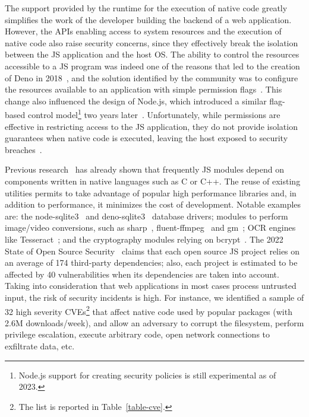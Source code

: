 The support provided by the runtime for the execution of native code
greatly simplifies the work of the developer building the backend of a
web application. However, the APIs enabling access to system resources
and the execution of native code also raise security concerns, since
they effectively break the isolation between the JS application and
the host OS. The ability to control the resources accessible to a JS
program was indeed one of the reasons that led to the creation of Deno
in 2018~\cite{nodejs-regret}, and the solution identified by the
community was to configure the resources available to an application
with simple permission flags~\cite{deno-permissions}. This change also
influenced the design of Node.js, which introduced a similar
flag-based control model\footnote{Node.js support for creating
  security policies is still experimental as of 2023.} two years
later~\cite{node-permissions}. Unfortunately, while permissions are
effective in restricting access to the JS application, they do not
provide isolation guarantees when native code is
executed,
leaving the host exposed to security breaches~\cite{deno-permissions}.

Previous research~\cite{staicu2021bilingual,npm-malicious-update} has
already shown that frequently JS modules depend on components written
in native languages such as C or C++.  The reuse of existing utilities
permits to take advantage of popular high performance libraries and,
in addition to performance, it minimizes the cost of
development. Notable examples are: the node-sqlite3~\cite{
  node-sqlite3} and deno-sqlite3~\cite{deno-sqlite3} database drivers;
modules to perform image/video conversions, such as
sharp~\cite{sharp}, fluent-ffmpeg~\cite{fluentffmpeg-npm} and
gm~\cite{gm-npm}; OCR engines like Tesseract~\cite{tesseract}; and the
cryptography modules relying on bcrypt~\cite{bcrypt}. The 2022 State
of Open Source Security~\cite{snyk-report} claims that each open
source JS project relies on an average of 174 third-party
dependencies; also, each project is estimated to be affected by 40
vulnerabilities when its dependencies are taken into account. Taking
into consideration that web applications in most cases process
untrusted input, the risk of security incidents is high. For instance,
we identified a sample of 32 high severity CVEs\footnote{The list is
  reported in Table~\ref{table-cve}.} that affect native code used by
popular packages (with 2.6M \mbox{downloads/week}), and allow an
adversary to corrupt the filesystem, perform privilege escalation,
execute arbitrary code, open network connections to exfiltrate data,
etc.


